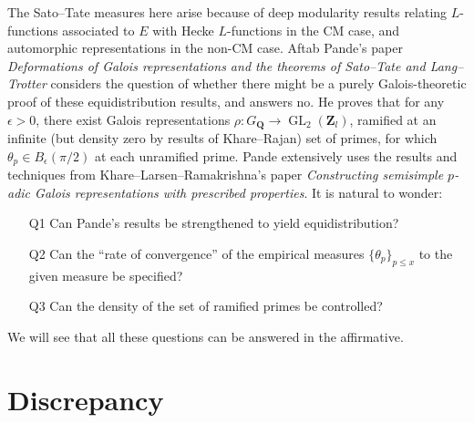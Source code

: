 \documentclass{article}
\DeclareMathOperator{\GL}{GL}
\newcommand{\bQ}{\mathbf{Q}}
\newcommand{\bZ}{\mathbf{Z}}
\begin{document}
The Sato--Tate measures here arise because of deep modularity results relating 
$L$-functions associated to $E$ with Hecke $L$-functions in the CM case, and 
automorphic representations in the non-CM case. Aftab Pande's paper 
\emph{Deformations of Galois representations and the theorems of Sato--Tate 
and Lang--Trotter} considers the question of whether there might be a purely 
Galois-theoretic proof of these equidistribution results, and answers no. He 
proves that for any $\epsilon>0$, there exist Galois representations 
$\rho\colon G_\bQ \to \GL_2(\bZ_l)$, ramified at an infinite (but density zero 
by results of Khare--Rajan) 
set of primes, for which $\theta_p\in B_\epsilon(\pi/2)$ at each unramified 
prime. Pande extensively uses the results and techniques from 
Khare--Larsen--Ramakrishna's paper \emph{Constructing semisimple $p$-adic 
Galois representations with prescribed properties}. It is natural to wonder: 
\begin{itemize}
\item[Q1]
Can Pande's results be strengthened to yield equidistribution? 

\item[Q2]
Can the ``rate of convergence'' of the empirical measures 
$\{\theta_p\}_{p\leqslant x}$ to the given measure be specified? 

\item[Q3]
Can the density of the set of ramified primes be controlled? 
\end{itemize}
We will see that all these questions can be answered in the affirmative. 





\section{Discrepancy}
\end{document}
